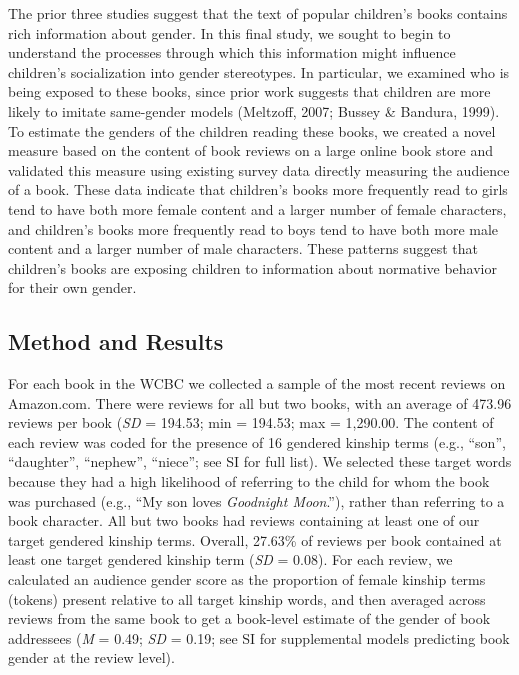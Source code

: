 \documentclass[english,,man,floatsintext]{apa6}
\begin{document}
The prior three studies suggest that the text of popular children's books contains rich information about gender. In this final study, we sought to begin to understand the processes through which this information might influence children's socialization into gender stereotypes. In particular, we examined who is being exposed to these books, since prior work suggests that children are more likely to imitate same-gender models (Meltzoff, 2007; Bussey \& Bandura, 1999). To estimate the genders of the children reading these books, we created a novel measure based on the content of book reviews on a large online book store and validated this measure using existing survey data directly measuring the audience of a book. These data indicate that children's books more frequently read to girls tend to have both more female content and a larger number of female characters, and children's books more frequently read to boys tend to have both more male content and a larger number of male characters. These patterns suggest that children's books are exposing children to information about normative behavior for their own gender.

\hypertarget{method-and-results}{%
\subsection{Method and Results}\label{method-and-results}}

For each book in the WCBC we collected a sample of the most recent reviews on Amazon.com. There were reviews for all but two books, with an average of 473.96 reviews per book (\emph{SD} = 194.53; min = 194.53; max = 1,290.00. The content of each review was coded for the presence of 16 gendered kinship terms (e.g., \enquote{son}, \enquote{daughter}, \enquote{nephew}, \enquote{niece}; see SI for full list). We selected these target words because they had a high likelihood of referring to the child for whom the book was purchased (e.g., \enquote{My son loves \emph{Goodnight Moon}.}), rather than referring to a book character. All but two books had reviews containing at least one of our target gendered kinship terms. Overall, 27.63\% of reviews per book contained at least one target gendered kinship term (\emph{SD} = 0.08). For each review, we calculated an audience gender score as the proportion of female kinship terms (tokens) present relative to all target kinship words, and then averaged across reviews from the same book to get a book-level estimate of the gender of book addressees (\emph{M} = 0.49; \emph{SD} = 0.19; see SI for supplemental models predicting book gender at the review level).
\end{document}
